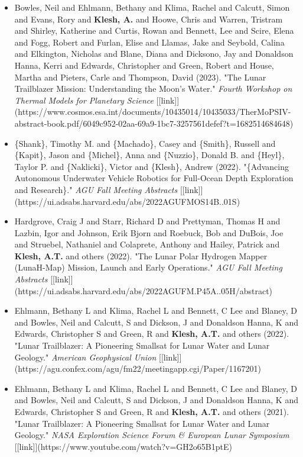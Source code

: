 \documentclass[11pt,letterpaper]{article}
\begin{document}
\begin{itemize}
\item Bowles, Neil and Ehlmann, Bethany and Klima, Rachel and Calcutt, Simon and Evans, Rory and \textbf{Klesh, A.} and Hoowe, Chris and Warren, Tristram and Shirley, Katherine and Curtis, Rowan and Bennett, Lee and Scire, Elena and Fogg, Robert and Furlan, Elise and Llamas, Jake and Seybold, Calina and Elkington, Nicholas and Blane, Diana and Dicksono, Jay and Donaldson Hanna, Kerri and Edwards, Christopher and Green, Robert and House, Martha and Pieters, Carle and Thompson, David (2023). "The Lunar Trailblazer Mission: Understanding the Moon's Water." \textit{Fourth Workshop on Thermal Models for Planetary Science} [[link]](https://www.cosmos.esa.int/documents/10435014/10435033/TherMoPSIV-abstract-book.pdf/6049c952-02aa-69a9-1bc7-3257561defef?t=1682514684648)
\item \{Shank\}, Timothy M. and \{Machado\}, Casey and \{Smith\}, Russell and \{Kapit\}, Jason and \{Michel\}, Anna and \{Nuzzio\}, Donald B. and \{Heyl\}, Taylor P. and \{Naklicki\}, Victor and \{Klesh\}, Andrew (2022). "\{Advancing Autonomous Underwater Vehicle Robotics for Full-Ocean Depth Exploration and Research\}." \textit{AGU Fall Meeting Abstracts} [[link]](https://ui.adsabs.harvard.edu/abs/2022AGUFMOS14B..01S)
\item Hardgrove, Craig J and Starr, Richard D and Prettyman, Thomas H and Lazbin, Igor and Johnson, Erik Bjorn and Roebuck, Bob and DuBois, Joe and Struebel, Nathaniel and Colaprete, Anthony and Hailey, Patrick and \textbf{Klesh, A.T.} and others (2022). "The Lunar Polar Hydrogen Mapper (LunaH-Map) Mission, Launch and Early Operations." \textit{AGU Fall Meeting Abstracts} [[link]](https://ui.adsabs.harvard.edu/abs/2022AGUFM.P45A..05H/abstract)
\item Ehlmann, Bethany L and Klima, Rachel L and Bennett, C Lee and Blaney, D and Bowles, Neil and Calcutt, S and Dickson, J and Donaldson Hanna, K and Edwards, Christopher S and Green, R and \textbf{Klesh, A.T.} and others (2022). "Lunar Trailblazer: A Pioneering Smallsat for Lunar Water and Lunar Geology." \textit{American Geophysical Union} [[link]](https://agu.confex.com/agu/fm22/meetingapp.cgi/Paper/1167201)
\item Ehlmann, Bethany L and Klima, Rachel L and Bennett, C Lee and Blaney, D and Bowles, Neil and Calcutt, S and Dickson, J and Donaldson Hanna, K and Edwards, Christopher S and Green, R and \textbf{Klesh, A.T.} and others (2021). "Lunar Trailblazer: A Pioneering Smallsat for Lunar Water and Lunar Geology." \textit{NASA Exploration Science Forum \& European Lunar Symposium} [[link]](https://www.youtube.com/watch?v=GH2o65B1ptE)

\end{itemize}
\end{document}
